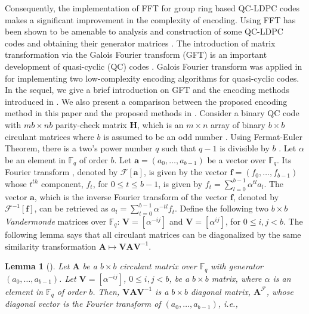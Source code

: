 \documentclass[journal,draftclsnofoot,onecolumn,12pt,twoside]{IEEEtran}
\newtheorem{lemma}[theorem]{Lemma}
\begin{document}
\textcolor{mycolor}{Consequently, the implementation of FFT for group ring based QC-LDPC codes makes a significant improvement in the complexity of encoding. Using FFT has been shown to be amenable to analysis and construction of
some QC-LDPC codes and obtaining their generator matrices \cite{C10}. The introduction of matrix transformation via the Galois Fourier transform (GFT) is an important development of  quasi-cyclic (QC) codes \cite{C10}. Galois Fourier transform was applied in \cite{FFT_encoding} for implementing two low-complexity encoding algorithms for quasi-cyclic codes. In the sequel, we give a brief introduction on GFT and the encoding methods introduced in \cite{FFT_encoding}. We also present a comparison between the proposed encoding method in this paper and the proposed methods in  \cite{FFT_encoding}.
\newline
Consider a binary QC code with $mb\times nb$ parity-check matrix $\mathbf{H}$,  which is an $m\times n$ array of binary $b\times b$ circulant matrices where $b$ is assumed to be an   odd number \cite{C10}. Using Fermat-Euler Theorem, there is a two's power number $q$ such that $q-1$ is divisible by $b$ \cite{blahut}. Let $\alpha$ be an element in $\mathbb{F}_q$ of order $b$. Let $\mathbf{a}=(a_0,\ldots,a_{b-1})$  be a vector over $\mathbb{F}_q$. Its Fourier
transform \cite{FFT_encoding}, denoted by $\mathcal{F}[\mathbf{a}]$, is given by the vector $\mathbf{f}=(f_0,\ldots,f_{b-1})$ whose $t^{th}$ component, $f_t$, for $0\leq t\leq b-1$, is given by $f_t=\sum_{l=0}^{b-1}\alpha^{tl}a_l$. The vector $\mathbf{a}$, which is the inverse Fourier transform of the vector $\mathbf{f}$, denoted by $\mathcal{F}^{-1}[\mathbf{f}]$, can be retrieved as $a_l=\sum_{t=0}^{b-1}\alpha^{-tl}f_t$. Define the following two $b\times b$ \emph{Vandermonde}  matrices over $\mathbb{F}_q$: $\mathbf{V}=\left[\alpha^{-ij}\right]$ and $\mathbf{V}=\left[\alpha^{ij}\right]$, for $0 \leq i,j < b$. The following lemma says that all circulant matrices can be diagonalized by the same similarity transformation $\mathbf{A}\mapsto \mathbf{V} \mathbf{A} \mathbf{V}^{-1}$.
\begin{lemma}[\emph{\cite[Lemma 1]{C10}}]
Let $\mathbf{A}$ be a $b\times b$ circulant matrix over $\mathbb{F}_q$ with generator $(a_0,\ldots,a_{b-1})$. Let  $\mathbf{V}=\left[\alpha^{-ij}\right]$, $0 \leq i,j < b$, be a $b\times b$ matrix, where $\alpha$ is an element in
$\mathbb{F}_q$ of order $b$. Then,  $\mathbf{V} \mathbf{A} \mathbf{V}^{-1}$ is a $b\times b$ diagonal matrix, $\mathbf{A}^{\mathcal{F}}$, whose diagonal vector is the Fourier transform of $(a_0,\ldots,a_{b-1})$, i.e.,

\end{lemma}}
\end{document}

